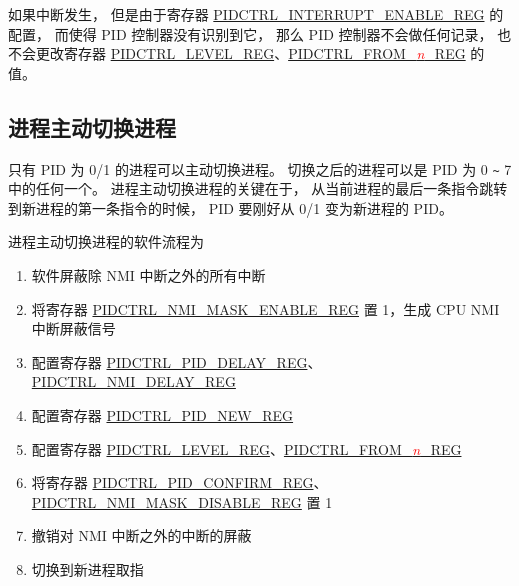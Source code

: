 \documentclass[main\_\_CN.tex]{subfiles}
\begin{document}
如果中断发生，
但是由于寄存器 \hyperref[regdesc:PIDCTRLINTERRUPTENABLEREG]{PIDCTRL\_INTERRUPT\_ENABLE\_REG} 的配置，
而使得 PID 控制器没有识别到它，
那么 PID 控制器不会做任何记录，
也不会更改寄存器 \hyperref[regdesc:PIDCTRLLEVELREG]{PIDCTRL\_LEVEL\_REG}、\hyperref[regdesc:PIDCTRLFROMnREG]{PIDCTRL\_FROM\_\textcolor{red}{\it{n}}\_REG} 的值。

\subsection{进程主动切换进程}

只有 PID 为 0/1 的进程可以主动切换进程。
切换之后的进程可以是 PID 为 0 \verb+~+ 7 中的任何一个。
进程主动切换进程的关键在于，
从当前进程的最后一条指令跳转到新进程的第一条指令的时候，
PID 要刚好从 0/1 变为新进程的 PID。

进程主动切换进程的软件流程为

\begin{enumerate}
    \item 软件屏蔽除 NMI 中断之外的所有中断
        \setcounter{STEP_MASK_NON_NMI}{\theenumi}
    \item 将寄存器 \hyperref[regdesc:PIDCTRLNMIMASKENABLEREG]{PIDCTRL\_NMI\_MASK\_ENABLE\_REG} 置 1，生成 CPU NMI 中断屏蔽信号
        \setcounter{STEP_MASK_NMI}{\theenumi}
    \item 配置寄存器 \hyperref[regdesc:PIDCTRLPIDDELAYREG]{PIDCTRL\_PID\_DELAY\_REG}、\hyperref[regdesc:PIDCTRLNMIDELAYREG]{PIDCTRL\_NMI\_DELAY\_REG}
        \setcounter{STEP_SET_DELAY}{\theenumi}
    \item 配置寄存器 \hyperref[regdesc:PIDCTRLPIDNEWREG]{PIDCTRL\_PID\_NEW\_REG}
        \setcounter{STEP_SET_PID_NEW}{\theenumi}
    \item 配置寄存器 \hyperref[regdesc:PIDCTRLLEVELREG]{PIDCTRL\_LEVEL\_REG}、\hyperref[regdesc:PIDCTRLFROMnREG]{PIDCTRL\_FROM\_\textcolor{red}{\it{n}}\_REG}
        \setcounter{STEP_RESTORE}{\theenumi}
    \item 将寄存器 \hyperref[regdesc:PIDCTRLPIDCONFIRMREG]{PIDCTRL\_PID\_CONFIRM\_REG}、\hyperref[regdesc:PIDCTRLNMIMASKDISABLEREG]{PIDCTRL\_NMI\_MASK\_DISABLE\_REG} 置 1
        \setcounter{STEP_CHANGE}{\theenumi}
    \item 撤销对 NMI 中断之外的中断的屏蔽
        \setcounter{STEP_RELEASE_NON_NMI}{\theenumi}
    \item 切换到新进程取指
        \setcounter{STEP_JUMP}{\theenumi}
\end{enumerate}
\end{document}
